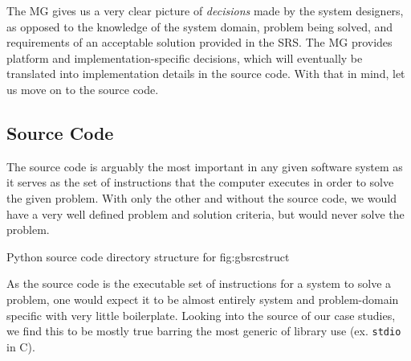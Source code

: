 The MG gives us a very clear picture of \textit{decisions} made by the system 
designers, as opposed to the knowledge of the system domain, problem being 
solved, and requirements of an acceptable solution provided in the SRS. The MG 
provides platform and implementation-specific decisions, which will eventually 
be translated into implementation details in the source code. With that in 
mind, let us move on to the source code.

\subsection{Source Code}

The source code is arguably the most important \sf{} in any given software 
system as it serves as the set of instructions that the computer executes in 
order to solve the given problem. With only the other \sfs{} and without the 
source code, we would have a very well defined problem and solution criteria, 
but would never solve the problem.

{Python source code directory structure for \gb{}}
{fig:gbsrcstruct}

As the source code is the executable set of instructions for a system to solve 
a problem, one would expect it to be almost entirely system and problem-domain 
specific with very little boilerplate. Looking into the source of our case 
studies, we find this to be mostly true barring the most generic of library use 
(ex. \lstinline[language=C]|stdio| in C).

